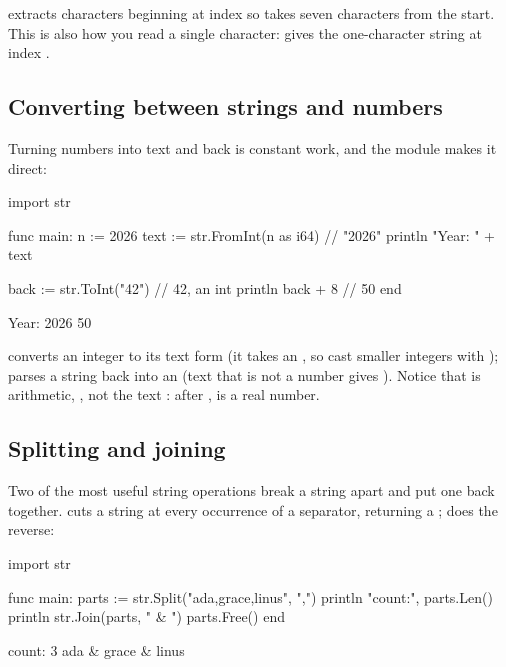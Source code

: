  extracts  characters beginning at index
 so  takes seven characters from
the start. This is also how you read a single character:  gives the one-character string at index .

\subsection{Converting between strings and numbers}

Turning numbers into text and back is constant work, and the  module
makes it direct:

\begin{salamen}
import str

func main:
    n := 2026
    text := str.FromInt(n as i64)     // "2026"
    println "Year: " + text

    back := str.ToInt("42")           // 42, an int
    println back + 8                  // 50
end
\end{salamen}

\begin{progout}
Year: 2026
50
\end{progout}

 converts an integer to its text form (it takes an ,
so cast smaller integers with );  parses a string
back into an  (text that is not a number gives ). Notice that
 is arithmetic, , not the text : after
,  is a real number.

\subsection{Splitting and joining}

Two of the most useful string operations break a string apart and put one back
together.  cuts a string at every occurrence of a separator,
returning a ;  does the reverse:

\begin{salamen}
import str

func main:
    parts := str.Split("ada,grace,linus", ",")
    println "count:", parts.Len()
    println str.Join(parts, " & ")
    parts.Free()
end
\end{salamen}

\begin{progout}
count: 3
ada & grace & linus
\end{progout}

